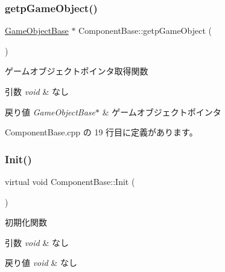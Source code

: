 \subsubsection{\texorpdfstring{getp\+Game\+Object()}{getpGameObject()}}
{\footnotesize\ttfamily \mbox{\hyperlink{class_game_object_base}{Game\+Object\+Base}} $\ast$ Component\+Base\+::getp\+Game\+Object (\begin{DoxyParamCaption}{ }\end{DoxyParamCaption})}



ゲームオブジェクトポインタ取得関数 


\begin{DoxyParams}{引数}
{\em void} & なし \\
\hline
\end{DoxyParams}

\begin{DoxyRetVals}{戻り値}
{\em Game\+Object\+Base$\ast$} & ゲームオブジェクトポインタ \\
\hline
\end{DoxyRetVals}


 Component\+Base.\+cpp の 19 行目に定義があります。

\mbox{\label{class_component_base_a125939d6befe42f28886a6523e86b18b}} 
\subsubsection{\texorpdfstring{Init()}{Init()}}
{\footnotesize\ttfamily virtual void Component\+Base\+::\+Init (\begin{DoxyParamCaption}{ }\end{DoxyParamCaption})\hspace{0.3cm}{\ttfamily [pure virtual]}}



初期化関数 


\begin{DoxyParams}{引数}
{\em void} & なし \\
\hline
\end{DoxyParams}

\begin{DoxyRetVals}{戻り値}
{\em void} & なし \\
\hline
\end{DoxyRetVals}



